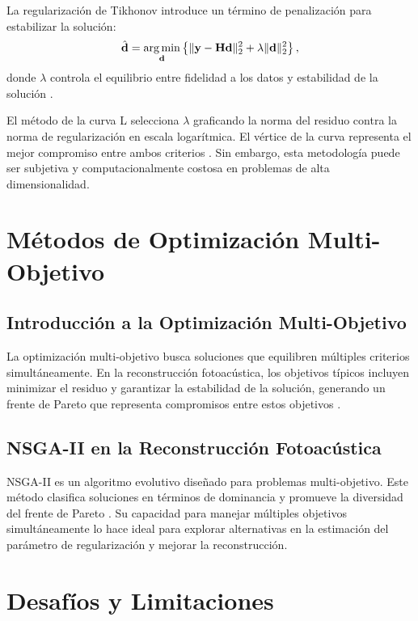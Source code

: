 La regularización de Tikhonov introduce un término de penalización para estabilizar la solución:
\begin{equation}
    \hat{\mathbf{d}} = \operatorname*{arg\,min}_{\mathbf{d}} \left\{ \| \mathbf{y} - \mathbf{H} \mathbf{d} \|_2^2 + \lambda \| \mathbf{d} \|_2^2 \right\},
\end{equation}
donde $\lambda$ controla el equilibrio entre fidelidad a los datos y estabilidad de la solución \cite{Tikhonov1963}.

El método de la curva L selecciona $\lambda$ graficando la norma del residuo contra la norma de regularización en escala logarítmica. El vértice de la curva representa el mejor compromiso entre ambos criterios \cite{Hansen1992}. Sin embargo, esta metodología puede ser subjetiva y computacionalmente costosa en problemas de alta dimensionalidad.

\section{Métodos de Optimización Multi-Objetivo} \label{sec:lit:second}

\subsection{Introducción a la Optimización Multi-Objetivo} \label{sec:lit:second:one}

La optimización multi-objetivo busca soluciones que equilibren múltiples criterios simultáneamente. En la reconstrucción fotoacústica, los objetivos típicos incluyen minimizar el residuo y garantizar la estabilidad de la solución, generando un frente de Pareto que representa compromisos entre estos objetivos \cite{Boyd2004}.

\subsection{NSGA-II en la Reconstrucción Fotoacústica} \label{sec:lit:second:two}

NSGA-II es un algoritmo evolutivo diseñado para problemas multi-objetivo. Este método clasifica soluciones en términos de dominancia y promueve la diversidad del frente de Pareto \cite{Deb2002}. Su capacidad para manejar múltiples objetivos simultáneamente lo hace ideal para explorar alternativas en la estimación del parámetro de regularización y mejorar la reconstrucción.

\section{Desafíos y Limitaciones} \label{sec:lit:third}

